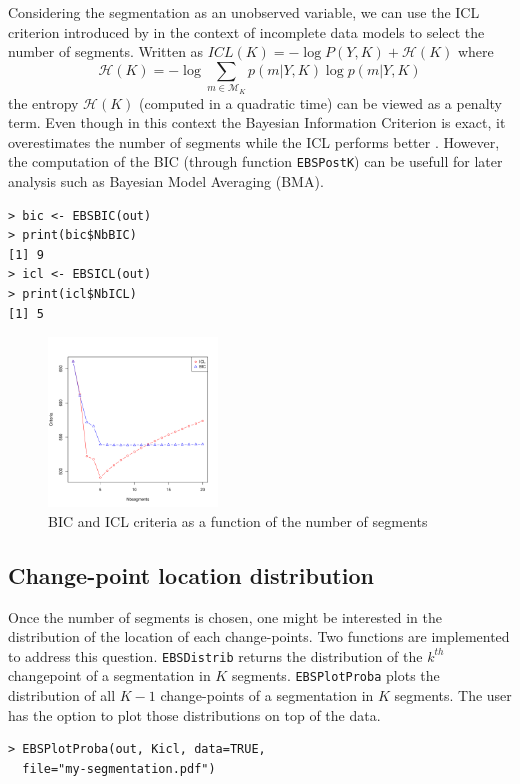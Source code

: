 \documentclass{bioinfo}
\begin{document}
\begin{methods}
Considering the segmentation as an unobserved variable, we can use the ICL criterion introduced by \cite{biernacki_assessingmixture_2000} in the context of incomplete data models to select the number of segments. Written as $ICL(K) = -\log P(Y,K) + \mathcal{H}(K) \label{ICL}$ where 
\begin{equation}
  \mathcal{H}(K)=-\log \sum_{m\in \mathcal{M}_K} p(m|Y,K) \log p(m|Y,K)
\end{equation}
the entropy $\mathcal{H}(K)$ (computed in a quadratic time) can be viewed as a penalty term. 
 Even though in this context the Bayesian Information Criterion is exact, it overestimates the number of segments while the ICL performs better \citep{rigaill_exact_2011}. However, the computation of the BIC (through function \texttt{EBSPostK}) can be usefull for later analysis such as Bayesian Model Averaging (BMA).
\begin{verbatim}
> bic <- EBSBIC(out)
> print(bic$NbBIC)
[1] 9
> icl <- EBSICL(out)
> print(icl$NbICL)
[1] 5

\end{verbatim}


\begin{figure}[!h]%
\centerline{\includegraphics[width=4.5cm]{icl-bic.pdf}}
\caption{BIC and ICL criteria as a function of the number of segments} \label{fig:01}
\end{figure}






\subsection{Change-point location distribution}

Once the number of segments is chosen, one might be interested in the distribution of the location of each change-points. Two functions are implemented to address this question. \texttt{EBSDistrib} returns the distribution of the $k^{th}$ changepoint of a segmentation in $K$ segments. \texttt{EBSPlotProba} plots the distribution of all $K\!-\!1$ change-points of a segmentation in $K$ segments. The user has the option to plot those distributions on top of the data. 
\begin{verbatim}
> EBSPlotProba(out, Kicl, data=TRUE,
  file="my-segmentation.pdf")
\end{verbatim}


\end{methods}
\end{document}
